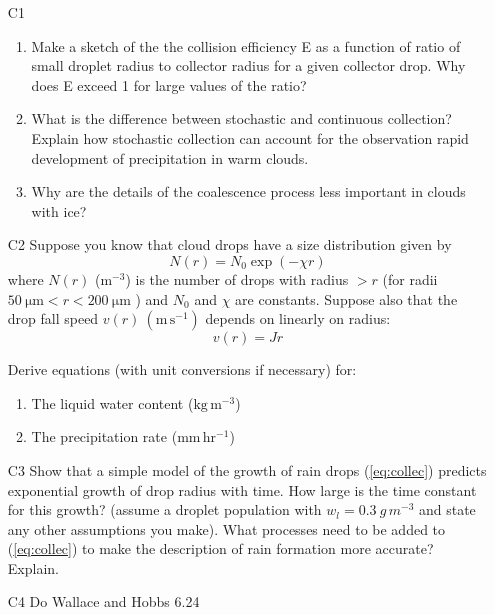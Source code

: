 \documentclass[12pt]{article}
\begin{document}
\begin{enumerate}

\item[C1] 

  \begin{enumerate}
  \item Make a sketch of the the collision efficiency E as a function
    of ratio of small droplet radius to collector radius for a given
    collector drop.  Why does E exceed 1 for large values of the
    ratio?
  \item What is the difference between stochastic and continuous
    collection? Explain how stochastic collection can account for the
    observation rapid development of precipitation in warm clouds.
  \item Why are the details of the coalescence process less important
    in clouds with ice?
  \end{enumerate}


\item[C2] Suppose you know that cloud drops have a size distribution given
  by 
  \begin{equation}
    \label{marshall}
    N(r)=N_0 \exp (- \chi r)
  \end{equation}
\noindent
where $N(r)$ ($\mathrm m^{-3}$) is the number of drops with radius $>
r$ (for radii $50\ \mathrm{\mu m} < r < 200\ \mathrm{\mu m}$ ) and $N_0$
and $\chi$ are constants.  Suppose also that the drop fall speed
$v(r)\ (\mathrm{m\,s^{-1}})$ 
depends on linearly on radius:
\begin{equation}
  \label{fallspeed}
  v(r)=Jr
\end{equation}

Derive equations (with unit conversions if necessary) for:

\begin{enumerate}
\item The liquid water content ($\mathrm{kg\,m^{-3}}$)
\item The precipitation rate ($\mathrm{mm\,hr^{-1}}$)
\end{enumerate}


\item[C3] Show that a simple model of the growth of rain drops
    (\ref{eq:collec}) predicts exponential growth of drop radius with
    time.  How large is the time constant for this growth? (assume a
    droplet population with $w_l = 0.3\ g\,m^{-3}$ and state any other
    assumptions you make).  What processes need to be added to
    (\ref{eq:collec}) to make the description of rain formation more
    accurate? Explain.



  \item[C4]  Do Wallace and Hobbs 6.24

\end{enumerate}
\end{document}
